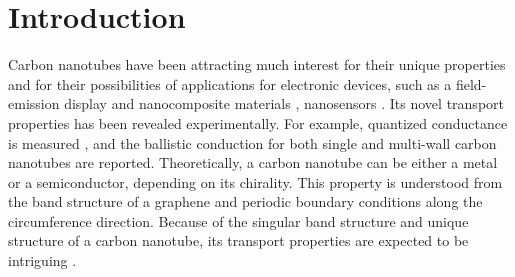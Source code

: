 \documentclass[journal=nalefd,manuscript=article,layout=twocolumn]{achemso}
\begin{document}
\section{Introduction}
Carbon nanotubes \cite{Iijima_1991, Iijima_1993} have been attracting much 
interest for their unique properties and for their possibilities of applications for electronic devices, 
such as
a field-emission display \cite{Liu_2010} and nanocomposite materials 
\cite{Byrne_2010}, nanosensors \cite{Allen_2007}.
Its novel transport properties has been revealed experimentally. For example, quantized conductance is measured \cite{Kong_2001}, 
and the ballistic conduction for both single \cite{Javey_2003} and multi-wall\cite{Berger_2002} 
carbon nanotubes are reported. 
Theoretically, a carbon nanotube can be either a metal or a semiconductor, 
depending on its chirality. This property is understood from the band structure 
of a graphene and periodic boundary conditions along the circumference direction. 
Because of the singular band structure and unique structure of a carbon nanotube, its transport properties are expected to be intriguing 
\cite{Miyamoto_1994,Ando_2000,Ando_1998,Nakanishi_1999}. 
 
\end{document}
